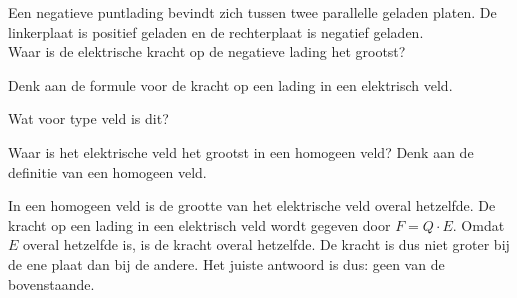\documentclass{ximera}
\begin{document}
\begin{question}\label{v:veld2ladingen}
    Een negatieve puntlading bevindt zich tussen twee parallelle geladen platen. De linkerplaat is positief geladen en de rechterplaat is negatief geladen.\\

    Waar is de elektrische kracht op de negatieve lading het grootst?

    \begin{hint}
        Denk aan de formule voor de kracht op een lading in een elektrisch veld.
    \end{hint}
    \begin{hint}
        Wat voor type veld is dit?
    \end{hint}
    \begin{hint}
        Waar is het elektrische veld het grootst in een homogeen veld? Denk aan de definitie van een homogeen veld.
    \end{hint}

    \begin{solution}\nl
        In een homogeen veld is de grootte van het elektrische veld overal hetzelfde. De kracht op een lading in een elektrisch veld wordt gegeven door $F = Q \cdot E$. Omdat $E$ overal hetzelfde is, is de kracht overal hetzelfde. De kracht is dus niet groter bij de ene plaat dan bij de andere. Het juiste antwoord is dus: geen van de bovenstaande.
    \end{solution}
\end{question}
\end{document}
